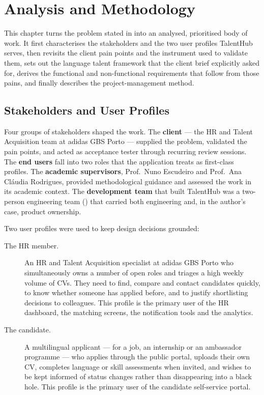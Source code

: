 ﻿\chapter{Analysis and Methodology}
\label{cap:analysis}

This chapter turns the problem stated in  into
an analysed, prioritised body of work. It first characterises the
stakeholders and the two user profiles TalentHub serves, then revisits the
client pain points and the instrument used to validate them, sets out the
language talent framework that the client brief explicitly asked for,
derives the functional and non-functional requirements that follow from
those pains, and finally describes the project-management method.


\section{Stakeholders and User Profiles}
\label{sec:analysis-stakeholders}

Four groups of stakeholders shaped the work. The \textbf{client} --- the HR
and Talent Acquisition team at adidas GBS Porto --- supplied the problem,
validated the pain points, and acted as acceptance tester through recurring
review sessions. The \textbf{end users} fall into two roles that the
application treats as first-class profiles. The \textbf{academic
supervisors}, Prof.\ Nuno Escudeiro and Prof.\ Ana Cl\'audia Rodrigues,
provided methodological guidance and assessed the work in its academic
context. The \textbf{development team} that
built TalentHub was a two-person engineering team ()
that carried both engineering and, in the author's case, product ownership.

Two user profiles were used to keep design decisions grounded:

\begin{description}
	\item[The HR member.] An HR and Talent Acquisition specialist at adidas
	GBS Porto who simultaneously owns a number of open roles and triages a
	high weekly volume of CVs. They need to find, compare and contact
	candidates quickly, to know whether someone has applied before, and to
	justify shortlisting decisions to colleagues. This profile is the primary
	user of the HR dashboard, the matching screens, the notification tools and
	the analytics.

	\item[The candidate.] A multilingual applicant --- for a job, an
	internship or an ambassador programme --- who applies through the public
	portal, uploads their own CV, completes language or skill assessments when
	invited, and wishes to be kept informed of status changes rather than
	disappearing into a black hole. This profile is the primary user of the
	candidate self-service portal.
\end{description}

